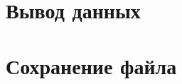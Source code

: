 \documentclass[12pt, a4paper]{article}
\begin{document}











\newpage
\section{Вывод данных}






















\newpage
\section{Сохранение файла}

\end{document}
